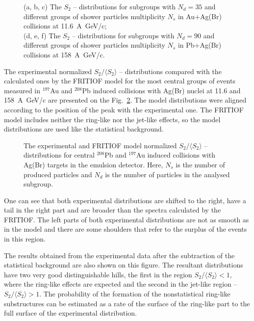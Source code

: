 \documentclass[12pt]{article}
\newcommand{\SDVA}{\langle S_2 \rangle}
\begin{document}
\begin{figure}[!h]
\begin{center}
\end{center}
\caption[*]{ (a, b, c) The $S_2$ -- distributions for subgroups with $N_d = 35$ and different groups of shower particles multiplicity $N_s$ in Au+Ag(Br) collisions at 11.6~A~GeV/c;\\
(d, e, f)  The $S_2$ -- distributions for subgroups with $N_d = 90$ and different groups of shower particles multiplicity $N_s$ in Pb+Ag(Br) collisions at 158~A~GeV/c. }
\label{fig04}
\end{figure}


The experimental normalized $S_2/\SDVA$ -- distributions compared with the calculated ones by the FRITIOF model for the most central groups of events measured in ${}^{197}$Au and ${}^{208}$Pb induced collisions with Ag(Br) nuclei at 11.6 and 158~A~GeV/c are presented on the Fig.~\ref{fig06}. The model distributions were aligned according to the position of the peak with the expe\-ri\-mental one. The FRITIOF model includes neither the ring-like nor the jet-like effects, so the model distributions are used like the statistical background.\\

\begin{figure}[!t]
\epsfysize=7cm
\begin{center}
\end{center}
\caption[*]{ The experimental and FRITIOF model normalized $S_2/\SDVA$ -- distributions for central ${}^{208}$Pb and ${}^{197}$Au induced collisions with Ag(Br) targets in the emulsion detector. Here, $N_s$ is the number of produced particles and $N_d$ is the number of particles in the analysed subgroup. }
\label{fig06}
\end{figure}

One can see that both experimental distributions are shifted to the right, have a tail in the right part and are broader than the spectra calculated by the FRITIOF. The left parts of both experimental distributions are not as smooth as in the model and there are some shoulders that refer to the surplus of the events in this region. 

The results obtained from the experimental data after the subtraction of the statistical background are also shown on this figure. The resultant distributions have two very good distinguishable hills, the first in the region $S_2/\SDVA < 1$, where the ring-like effects are expected and the second in the jet-like region --  $S_2/\SDVA > 1$. The probability of the formation of the nonstatistical ring-like substructures can be estimated as a rate of the surface of the ring-like part to the full surface of the experimental distribution.\\
\end{document}
